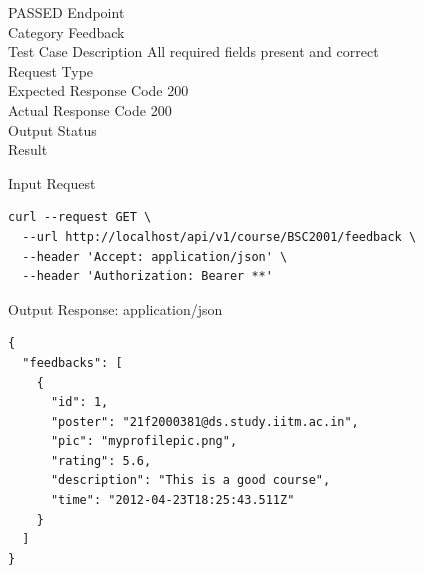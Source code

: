 \begin{testcase}{82}{PASSED}
Endpoint \hfill {}\\
Category \hfill Feedback\\
Test Case Description \hfill All required fields present and correct\\

Request Type    \hfill {}\\
Expected Response Code    \hfill 200\\
Actual Response Code    \hfill 200\\

Output Status \hfill {}\\
Result \hfill {}

\begin{ipblock}{Input Request}
\begin{verbatim}
curl --request GET \
  --url http://localhost/api/v1/course/BSC2001/feedback \
  --header 'Accept: application/json' \
  --header 'Authorization: Bearer **'
\end{verbatim}
\end{ipblock}

\begin{opblock}{Output Response: application/json}
\begin{verbatim}
{
  "feedbacks": [
    {
      "id": 1,
      "poster": "21f2000381@ds.study.iitm.ac.in",
      "pic": "myprofilepic.png",
      "rating": 5.6,
      "description": "This is a good course",
      "time": "2012-04-23T18:25:43.511Z"
    }
  ]
}
\end{verbatim}
\end{opblock}
\end{testcase}

